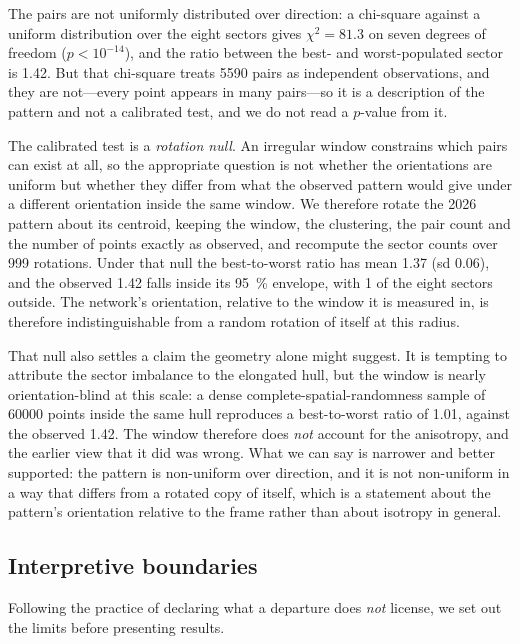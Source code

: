 \documentclass[fleqn,10pt,lineno]{wlpeerj}
\newcommand{\isoRatio}{1.42}
\newcommand{\isoChi}{81.3}
\newcommand{\isoRotMean}{1.37}
\newcommand{\isoRotSd}{0.06}
\newcommand{\isoRotOutside}{1}
\begin{document}
The pairs are not uniformly distributed over direction: a chi-square against a uniform
distribution over the eight sectors gives $\chi^2 = \isoChi$ on seven degrees of freedom
($p < 10^{-14}$), and the ratio between the best- and worst-populated sector is
\isoRatio{}. But that chi-square treats \num{5590} pairs as independent observations, and
they are not---every point appears in many pairs---so it is a description of the pattern and
not a calibrated test, and we do not read a $p$-value from it.

The calibrated test is a \emph{rotation null}. An irregular window constrains which pairs can
exist at all, so the appropriate question is not whether the orientations are uniform but
whether they differ from what the observed pattern would give under a different orientation
inside the same window. We therefore rotate the 2026 pattern about its centroid, keeping the
window, the clustering, the pair count and the number of points exactly as observed, and
recompute the sector counts over \num{999} rotations. Under that null the best-to-worst ratio
has mean \isoRotMean{} (sd \isoRotSd), and the observed \isoRatio{} falls inside its
\SI{95}{\percent} envelope, with \isoRotOutside{} of the eight sectors outside. The network's
orientation, relative to the window it is measured in, is therefore indistinguishable from a
random rotation of itself at this radius.

That null also settles a claim the geometry alone might suggest. It is tempting to attribute the
sector imbalance to the elongated hull, but the window is nearly orientation-blind at this
scale: a dense complete-spatial-randomness sample of \num{60000} points inside the same hull
reproduces a best-to-worst ratio of \num{1.01}, against the observed \isoRatio{}. The window
therefore does \emph{not} account for the anisotropy, and the earlier view that it did was
wrong. What we can say is narrower and better supported: the pattern is non-uniform over
direction, and it is not non-uniform in a way that differs from a rotated copy of itself, which
is a statement about the pattern's orientation relative to the frame rather than about isotropy
in general.

\subsection*{Interpretive boundaries}
\label{sec:boundaries}

Following the practice of declaring what a departure does \emph{not} license, we set out
the limits before presenting results.
\end{document}
